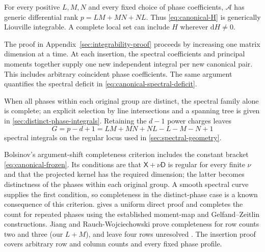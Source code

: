 \begin{theorem}\label{thm:canonical-independence}
For every positive $L,M,N$ and every fixed choice of phase coefficients,
$\mathcal A$ has generic differential rank $p=LM+MN+NL$.
Thus \cref{eq:canonical-H} is generically Liouville integrable.
A complete local set can include $H$ wherever $\mathrm dH\ne0$.
\end{theorem}
The proof in Appendix~\ref{sec:integrability-proof} proceeds by
increasing one matrix dimension at a time. At each insertion, the
spectral coefficients and principal moments together supply one new
independent integral per new canonical pair. This includes arbitrary
coincident phase coefficients. The same argument quantifies the
spectral deficit in \cref{eq:canonical-spectral-deficit}.

When all phases within each original group are distinct, the spectral
family alone is complete; an explicit selection by
line intersections and a spanning tree is given in
\cref{sec:distinct-phase-integrals}. Retaining the $d-1$ power charges
leaves
\begin{equation}\label{eq:canonical-genus-preview}
 G=p-d+1=LM+MN+NL-L-M-N+1
\end{equation}
spectral integrals on the regular locus used in
\cref{sec:spectral-geometry}.

Bolsinov's argument-shift completeness criterion
\cite[Theorem~1.1]{Bolsinov1992} includes the constant bracket
\cref{eq:canonical-frozen}. Its conditions are that
$\mathsf X+\nu\mathsf D$ is regular for every finite $\nu$ and that
the projected kernel has the required dimension; the latter becomes
distinctness of the phases within each original group.
A smooth spectral curve supplies the first condition, so completeness
in the distinct-phase case is a known consequence of this criterion.
 gives a uniform direct proof and
completes the count for repeated phases using the established
moment-map and Gelfand--Zeitlin constructions.
Jiang and Rauch-Wojciechowski prove completeness for row counts two
and three (our $L+M$), and leave four rows unresolved
\cite[Sections II.B--II.C, especially p.~1723]{JRW1991}. The insertion proof covers
arbitrary row and column counts and every fixed phase profile.
